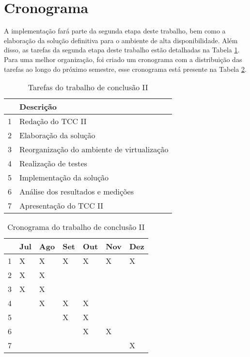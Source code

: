 \newpage
\section{Cronograma}
\label{section:cronograma}

A implementação fará parte da segunda etapa deste trabalho, bem como a elaboração da solução definitiva para o ambiente de alta disponibilidade. 
Além disso, as tarefas da segunda etapa deste trabalho estão detalhadas na Tabela \ref{tab:impltarefas}. Para uma melhor organização, foi criado
um cronograma com a distribuição das tarefas ao longo do próximo semestre, esse cronograma está presente na Tabela \ref{tab:implcronograma}.

\begin{table}[h!]\normalsize
\caption {Tarefas do trabalho de conclusão II}
\label{tab:impltarefas}
\begin{center}
\begin{tabular}{|l|l|}\hline
 & Descrição \\\hline
1 & Redação do TCC II \\\hline
2 & Elaboração da solução \\\hline
3 & Reorganização do ambiente de virtualização \\\hline
4 & Realização de testes \\\hline
5 & Implementação da solução \\\hline
6 & Análise dos resultados e medições \\\hline
7 & Apresentação do TCC II \\\hline
\end{tabular}
\end{center}
\end{table}

\begin{table}[h!]\normalsize
\caption {Cronograma do trabalho de conclusão II}
\label{tab:implcronograma}
\begin{center}
\begin{tabular}{|l|l|l|l|l|l|l|}\hline
 & Jul & Ago & Set & Out & Nov & Dez \\\hline
1 & X & X & X & X & X & X \\\hline
2 & X & X & & & & \\\hline
3 & X & X & & & & \\\hline
4 & & X & X & X & & \\\hline
5 & & & X & X & & \\\hline
6 & & & & X & X & \\\hline
7 & & & & & & X \\\hline
\end{tabular}
\end{center}
\end{table}
